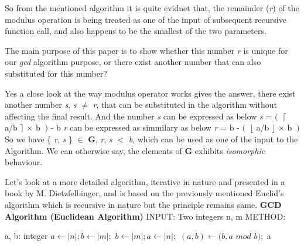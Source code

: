 \documentclass[12pt]{article}
\begin{document}
So from the mentioned algorithm it is quite evidnet that, the remainder (\textit{r}) of the modulus operation is being treated as one of the input of subsequent recursive function call, and also happens to be the smallest of the two parameters.

The main purpose of this paper is to show whether this number \textit{r} is unique for our \textit{gcd} algorithm purpose, or there exist another number that can also substituted for this number?

Yes a close look at the way modulus operator works gives the answer, there exist another  number \textit{s}, \textit{s} $\neq$ \textit{r}, that can be substituted in the algorithm without affecting the final result. And the number \textit{s} can be expressed as below
\newline \vspace{0mm} \hspace{4cm} \textit{s} = $ (\ $ $\lceil$ a/b $\rceil$  $\times $ b $\ )$ - b
\newline \textit{r} can be expressed as simmilary as below
\newline \vspace{0mm} \hspace{4cm}\textit{r} = b - $ (\ $ $\lfloor$ a/b $\rfloor$  $\times $ b $\ )$
\newline So we have \{ \textit{r}, \textit{s} \} $\in$ \textbf{G}, \textit{r}, \textit{s} $<$ \textit{b}, which can be used as one of the input to the Algorithm. 
\newline We can otherwise say, the elements of \textbf{G} exhibits \textit{isomorphic }  behaviour.

Let's look at a more detailed algorithm, iterative in nature and presented in a book by M. Dietzfelbinger, and is based on the previously mentioned Euclid's algorithm which is recursive in nature but the principle remains same.
\newline
\newline \textbf{GCD Algorithm (Euclidean Algorithm)}
\newline INPUT: Two integers n, m
\newline METHOD:


\begin{algorithmic}[1]
\STATE a, b: integer
	\STATE $a \gets |n|; b \gets |m|;$
\ELSE
	\STATE $b \gets |m|; a \gets |n|;$
\ENDIF
{} 
	\STATE $(a, b) \leftarrow (b, a  $ $mod $ $b);$
\ENDWHILE
\RETURN a
\end {algorithmic}
\end{document}
